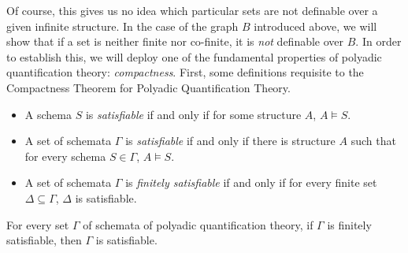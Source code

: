 Of course, this gives us no idea which particular sets are not definable over a given infinite structure. In the case of the graph $B$ introduced above, we will show that if a set is neither finite nor co-finite, it is \emph{not} definable over $B$. In order to establish this, we will deploy one of the fundamental properties of polyadic quantification theory: \emph{compactness}. First, some definitions requisite to the Compactness Theorem for Polyadic Quantification Theory.
\begin{itemize}
\item
A schema $S$ is \emph{satisfiable} if and only if for some structure $A$, $A\models S$.
\item
A set of schemata $\Gamma$ is \emph{satisfiable} if and only if there is structure $A$ such that for every schema $S\in \Gamma$, $A\models S$.
\item
A set of schemata $\Gamma$ is \emph{finitely satisfiable} if and only if for every finite set $\Delta\subseteq\Gamma$, $\Delta$ is satisfiable.
\end{itemize}
\begin{theorem}\label{compact-thm}
For every set $\Gamma$ of schemata  of polyadic quantification theory, if $\Gamma$ is finitely satisfiable, then $\Gamma$ is satisfiable. 
\end{theorem}


